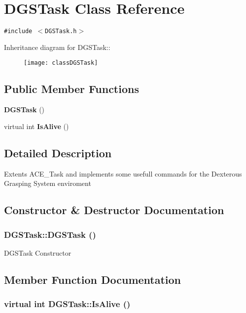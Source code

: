 \section{DGSTask Class Reference}
\label{classDGSTask}
{\tt \#include $<$DGSTask.h$>$}

Inheritance diagram for DGSTask::\begin{figure}[H]
\begin{center}
\leavevmode
\texttt{[image: classDGSTask]}
\end{center}
\end{figure}
\subsection*{Public Member Functions}
\begin{CompactItemize}
\item 
{\bf DGSTask} ()
\item 
virtual int {\bf Is\-Alive} ()
\end{CompactItemize}


\subsection{Detailed Description}
Extents ACE\_\-Task and implements some usefull commands for the Dexterous Grasping System enviroment 



\subsection{Constructor \& Destructor Documentation}
\subsubsection{\setlength{\rightskip}{0pt plus 5cm}DGSTask::DGSTask ()\hspace{0.3cm}{\tt  [inline]}}\label{classDGSTask_a0}


DGSTask Constructor 

\subsection{Member Function Documentation}
\subsubsection{\setlength{\rightskip}{0pt plus 5cm}virtual int DGSTask::Is\-Alive ()\hspace{0.3cm}{\tt  [inline, virtual]}}\label{classDGSTask_a1}


